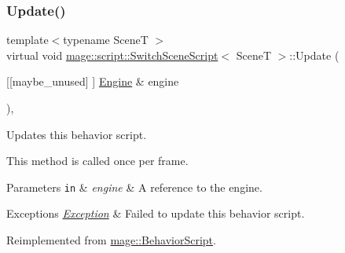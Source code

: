 \subsubsection{\texorpdfstring{Update()}{Update()}}
{\footnotesize\ttfamily template$<$typename SceneT $>$ \\
virtual void \hyperlink{classmage_1_1script_1_1_switch_scene_script}{mage\+::script\+::\+Switch\+Scene\+Script}$<$ SceneT $>$\+::Update (\begin{DoxyParamCaption}\item[{\mbox{[}\mbox{[}maybe\+\_\+unused\mbox{]} \mbox{]} \hyperlink{classmage_1_1_engine}{Engine} \&}]{engine }\end{DoxyParamCaption})\hspace{0.3cm}{\ttfamily [override]}, {\ttfamily [virtual]}}

Updates this behavior script.

This method is called once per frame.


\begin{DoxyParams}[1]{Parameters}
\mbox{\tt in}  & {\em engine} & A reference to the engine. \\
\hline
\end{DoxyParams}

\begin{DoxyExceptions}{Exceptions}
{\em \hyperlink{classmage_1_1_exception}{Exception}} & Failed to update this behavior script. \\
\hline
\end{DoxyExceptions}


Reimplemented from \hyperlink{classmage_1_1_behavior_script_a085634661326b59850c1111e537baa4e}{mage\+::\+Behavior\+Script}.


